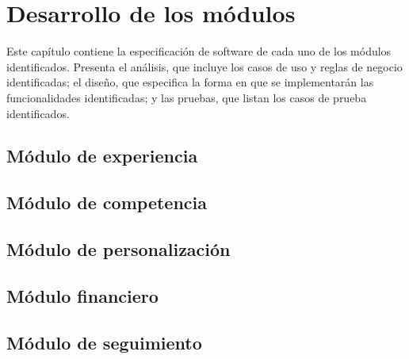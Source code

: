 
\chapter{Desarrollo de los módulos}\label{ch:modulos}

 Este capítulo contiene la especificación de software de cada uno de los módulos
 identificados. Presenta el análisis, que incluye los casos de uso y reglas de
 negocio identificadas; el diseño, que especifica la forma en que se implementarán
 las funcionalidades identificadas; y las pruebas, que listan los casos de prueba
 identificados.


    \section{Módulo de experiencia}\label{mod:exp}
    

    \section{Módulo de competencia}\label{mod:comp}
    

    \section{Módulo de personalización}\label{mod:pers}
    


    \section{Módulo financiero}\label{mod:financ}
    

    
    \section{Módulo de seguimiento}\label{mod:seguim}
    
